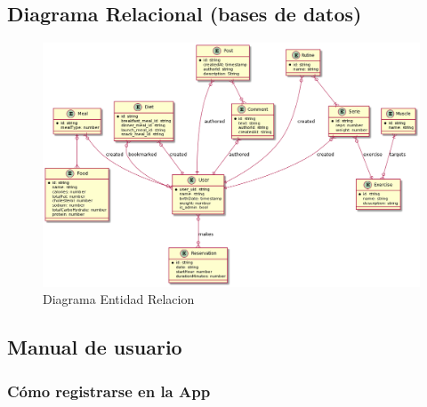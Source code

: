 \documentclass[12pt,a4paper]{article}
\begin{document}
\newpage

\subsection{Diagrama Relacional (bases de datos)}

\begin{figure}[h]
 	\centering
	\includegraphics[width=\textwidth]{diagramaer}
	\caption{Diagrama Entidad Relacion}
\end{figure}

\clearpage

\subsection{Manual de usuario}

\subsubsection{Cómo registrarse en la App}
\end{document}
